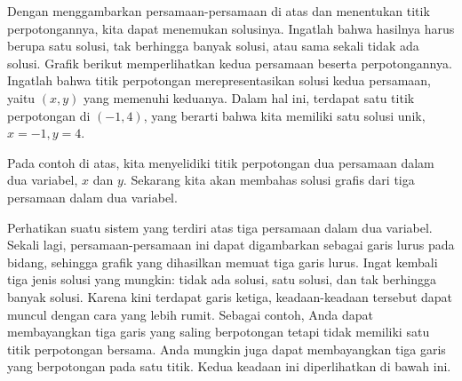 \begin{solution} Dengan menggambarkan persamaan-persamaan di atas dan menentukan titik perpotongannya, kita dapat menemukan solusinya. Ingatlah bahwa hasilnya harus berupa satu solusi, tak berhingga banyak solusi, atau sama sekali tidak ada solusi.
 Grafik berikut memperlihatkan kedua persamaan
beserta perpotongannya. Ingatlah bahwa titik perpotongan merepresentasikan solusi
kedua persamaan, yaitu $\left( x,y\right)$ yang memenuhi keduanya. Dalam hal ini,
terdapat satu titik perpotongan di $\left( -1, 4 \right)$, yang berarti bahwa kita memiliki satu solusi unik, $x = -1, y = 4$.

\begin{center}
\par{}\label{fig:systemsofequationsGeometry-tikz02}%

\end{center}
\end{solution}

Pada contoh di atas, kita menyelidiki titik perpotongan dua persamaan dalam dua variabel, $x$ dan $y$. Sekarang kita akan membahas
solusi grafis dari tiga persamaan dalam dua variabel.

Perhatikan suatu sistem yang terdiri atas tiga persamaan dalam dua variabel. Sekali lagi, persamaan-persamaan ini dapat digambarkan sebagai
garis lurus pada bidang, sehingga grafik yang dihasilkan memuat tiga garis lurus. Ingat kembali tiga jenis solusi yang mungkin: tidak ada solusi, satu solusi, dan tak berhingga banyak solusi.
Karena kini terdapat garis ketiga, keadaan-keadaan tersebut dapat muncul dengan cara yang lebih rumit. Sebagai contoh, Anda dapat membayangkan tiga garis yang saling berpotongan
tetapi tidak memiliki satu titik perpotongan bersama. Anda mungkin juga dapat membayangkan tiga garis
yang berpotongan pada satu titik. Kedua keadaan ini diperlihatkan di bawah ini.


